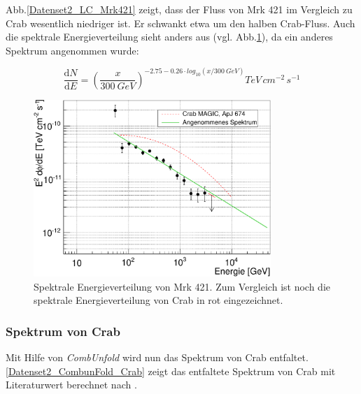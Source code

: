 Abb.\ref{Datenset2_LC_Mrk421} zeigt, dass der Fluss von Mrk 421 im Vergleich zu Crab wesentlich niedriger ist.
Er schwankt etwa um den halben Crab-Fluss.
Auch die spektrale Energieverteilung sieht anders aus (vgl. Abb.\ref{Datenset2_SED_Mrk421}), da ein anderes Spektrum angenommen wurde:

\begin{equation}
\frac{\mathrm{d}N}{\mathrm{d}E}=\left(\frac{x}{\SI{300}{GeV}}\right)^{-2.75-0.26 \cdot log_{10}(x/\SI{300}{GeV})}\si{TeV\,cm^{-2}\,s^{-1}}
\end{equation}


\begin{figure}
    \centering
    \includegraphics[width=0.8\textwidth]{./Plots/04_MrkAnalyse/Datenset2/SED_Mrk421.pdf}
    \caption{Spektrale Energieverteilung von Mrk 421.
    Zum Vergleich ist noch die spektrale Energieverteilung von Crab in rot eingezeichnet.}
    \label{Datenset2_SED_Mrk421}
\end{figure}


\subsubsection{Spektrum von Crab}
Mit Hilfe von \textit{CombUnfold} wird nun das Spektrum von Crab entfaltet.
\autoref{Datenset2_CombunFold_Crab} zeigt das entfaltete Spektrum von Crab mit Literaturwert berechnet nach \cite{LiteraturreferenzMAGIC}.

